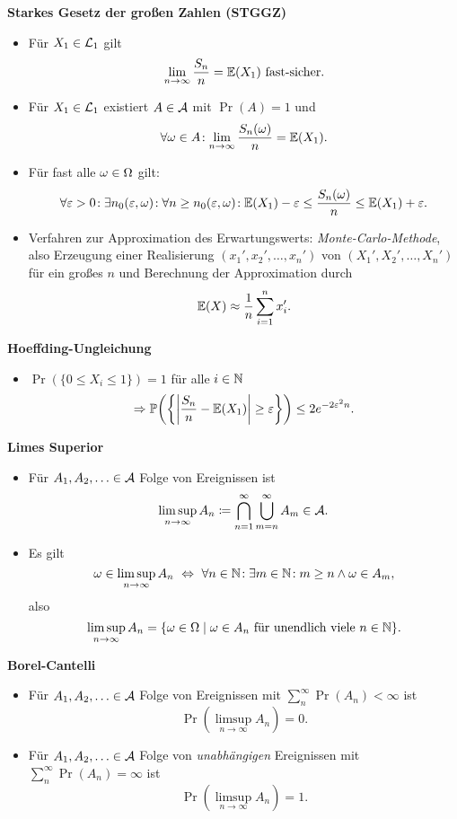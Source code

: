 \textbf{Starkes Gesetz der großen Zahlen (STGGZ)}
\begin{itemize}
	\item Für $X_1\in\mathcal{L}_1$ gilt
	\[
	  \limfty{n}\frac{S_n}{n}=\E(X_1)\ \text{fast-sicher}.
	\]
	
	\item Für $X_1\in\mathcal{L}_1$ existiert $A\in\mathcal{A}$ mit $\Pr(A)=1$ und
	\[
	  \forall\omega\in A\!: \lim\limits_{n\to\infty}\frac{S_n(\omega)}{n}=\mathbb{E}(X_1).
	\]
	
	\item Für fast alle $\omega\in\Omega$ gilt:
	\[
	  \forall\varepsilon>0\!:\exists n_0(\varepsilon,\omega)\!:\forall n\geq n_0(\varepsilon,\omega)\!:\mathbb{E}(X_1)-\varepsilon\leq\frac{S_n(\omega)}{n}\leq \mathbb{E}(X_1)+\varepsilon.
	\]
	
	\item Verfahren zur Approximation des Erwartungswerts: \emph{Monte-Carlo-Methode}, also Erzeugung einer Realisierung $(x_1',x_2',\ldots,x_n')$ von $(X_1',X_2',\ldots,X_n')$ für ein großes $n$ und Berechnung der Approximation durch
	\[
	  \mathbb{E}(X)\approx \frac{1}{n}\sum_{i=1}^n x_i'.
	\]
\end{itemize}

\textbf{Hoeffding-Ungleichung}
\begin{itemize}
	\item $\Pr(\{0\leq X_i\leq 1\})=1$ für alle $i\in\mathbb{N}$
	\[
      \Rightarrow \Pr\left(\left\{\left\lvert\frac{S_n}{n}-\E(X_1)\right\rvert\geq\varepsilon\right\}\right)\leq 2e^{-2\varepsilon^2 n}.
	\]
\end{itemize}

\textbf{Limes Superior}
\begin{itemize}
	\item Für $A_1,A_2,\ldots\in\mathcal{A}$ Folge von Ereignissen ist
	\[
	  \limsup_{n\to\infty} A_n\coloneqq\bigcap_{n=1}^\infty\bigcup_{m=n}^\infty A_m\in\mathcal{A}.
	\]

	\item Es gilt
	\[
	  \omega\in\limsup_{n\to\infty} A_n\ \Leftrightarrow\ \forall n\in\mathbb{N}\!:\exists m\in\mathbb{N}\!:m\geq n\wedge \omega\in A_m,
	\]
	also
	\[
	  \limsup_{n\to\infty} A_n=\{\o\in\O\mid\o\in A_n\ \text{für unendlich viele}\ n\in\N\}.
	\]
\end{itemize}

\textbf{Borel-Cantelli}
\begin{itemize}
	\item Für $A_1,A_2,\ldots\in\mathcal{A}$ Folge von Ereignissen mit $\sum_n^\infty \Pr(A_n)<\infty$ ist
	\[
	  \Pr(\limsup_{n\to\infty} A_n)=0.
	\]
	
	\item Für $A_1,A_2,\ldots\in\mathcal{A}$ Folge von \emph{unabhängigen} Ereignissen mit $\sum_n^\infty \Pr(A_n)=\infty$ ist
	\[
	  \Pr(\limsup_{n\to\infty} A_n)=1.
	\]
\end{itemize}

